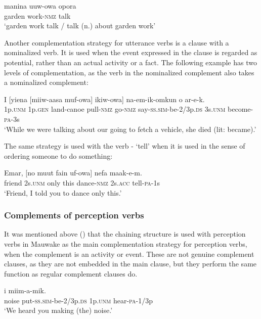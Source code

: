 \ea%
\label{ex:8:x1598}
\gll manina  uuw-owa  opora \\
garden  work-\textsc{nmz} talk\\
\glt`garden work talk / talk (n.) about garden work'
\z


Another complementation strategy for utterance verbs is a clause with a nominalized verb. It is used when the event expressed in the clause is regarded as potential, rather than an actual activity or a fact. The following example has two levels of complementation, as the verb in the nominalized complement also takes a nominalized complement:

\ea%
\label{ex:8:x1599}
\gll I  [yiena  [miiw-aasa  muf-owa]  ikiw-owa] na-em-ik-omkun  o  ar-e-k. \\
1p.\textsc{unm} 1p.\textsc{gen} land-canoe pull-\textsc{nmz} go-\textsc{nmz} say-\textsc{ss}.\textsc{sim}-be-2/3p.\textsc{ds} 3s.\textsc{unm} become-\textsc{pa}-3s\\
\glt`While we were talking about our going to fetch a vehicle, she died (lit: became).'
\z


The same strategy is used with the verb - `tell' when it is used in the sense of ordering someone to do something: 

\ea%
\label{ex:8:x1630}
\gll Emar,  [no  muut  fain  uf-owa]  nefa  maak-e-m.\\
friend  2s.\textsc{unm} only  this  dance-\textsc{nmz} 2s.\textsc{acc} tell-\textsc{pa}-1s\\
\glt`Friend, I told you to dance only this.'
\z


\subsubsection{Complements of perception verbs} \label{sec:8.3.2.2}

It was mentioned above () that the chaining structure is used with perception verbs in Mauwake as the main complementation strategy for perception verbs, when the complement is an activity or event. These are not genuine complement clauses, as they are not embedded in the main clause, but they perform the same function as regular complement clauses do. 

\ea%
\label{ex:8:x1512}
  i  miim-a-mik.\\
noise  put-\textsc{ss}.\textsc{sim}-be-2/3p.\textsc{ds} 1p.\textsc{unm}  hear-\textsc{pa}-1/3p\\
\glt`We heard you making (the) noise.'
\z


